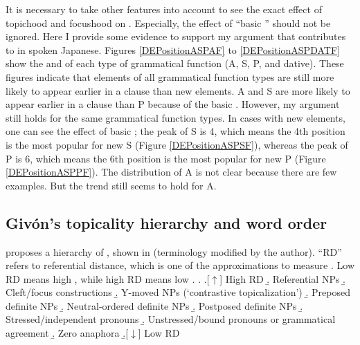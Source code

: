 It is necessary to take other features into account
to see the exact effect of topichood and focushood on . %
 Especially, the effect of ``basic '' should not be ignored.
Here I provide some evidence to support my argument that
 contributes to  in spoken Japanese.
Figures \ref{DEPositionASPAF} to \ref{DEPositionASPDATF} show the
 and  of each type of grammatical function (A, S, P, and dative).
These figures indicate that
 elements of all grammatical function types are still more likely to appear earlier in a clause than new elements.
A and S are more likely to appear earlier in a clause than P because of the basic .
However, my argument still holds for the same grammatical function types.
In cases with new elements,
one can see the effect of basic ;
the peak of S is 4,
which means the 4th position is the most popular for new S (Figure \ref{DEPositionASPSF}),
whereas the peak of P is 6, which means the 6th position is the most popular for new P (Figure \ref{DEPositionASPPF}).
The distribution of A is not clear because there are few examples.
But the trend still seems to hold for A.

\subsection{Giv\'on's topicality hierarchy and word order}\label{WO:Dis:Givon}

 proposes a hierarchy of , shown in \Next (terminology modified by the author).
``RD'' refers to referential distance,
which is one of the approximations to measure .
Low RD means high ,
while high RD means low .
%
\ex.\label{TopicHierarchy}
 \a.[$\uparrow$] High RD
 \b. Referential  NPs
 \b. Cleft/focus constructions
 \b. Y-moved NPs (`contrastive topicalization')
 \b. Preposed definite NPs
 \b. Neutral-ordered definite NPs
 \b. Postposed definite NPs
 \b. Stressed/independent pronouns
 \b. Unstressed/bound pronouns or grammatical agreement
 \b. Zero anaphora
 \b.[$\downarrow$] Low RD
 \hfill{\cite[][7]{givon83}}

